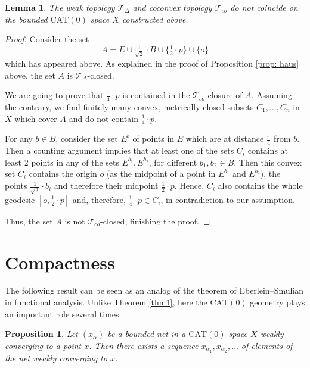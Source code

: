 \documentclass[12pt,leqno]{amsart}
\numberwithin{equation}{section}
\newtheorem{lem}[thm]{Lemma}
\newtheorem{prop}[thm]{Proposition}
\theoremstyle{remark}
\newcommand{\CAT}{\mathrm{CAT}}
\begin{document}
\begin{lem} \label{lem: differ}
	The weak topology $\mathcal T_{\Delta}$ and coconvex topology $\mathcal T_{co}$ do not coincide on the bounded $\CAT(0)$ space $X$ constructed above.
\end{lem}

\begin{proof}
Consider the set 
$$A=E\cup \tfrac 1 {\sqrt 2} \cdot B \cup \{\tfrac 1 2 \cdot p\} \cup \{o\}$$ which has appeared above.
As explained in the proof of Proposition \ref{prop: haus} above, the set $A$ is $\mathcal T_{\Delta}$-closed.

We are going to prove that $\frac 1 4 \cdot p$ is contained in the $\mathcal T_{co}$ closure of $A$. Assuming the contrary, we find finitely many convex, metrically closed subsets $C_1,...,C_n$ in $X$ which cover $A$ and do not contain $\frac 1 4 \cdot p$. 

For any $b\in B$, consider the set $E^b$ of points in $E$ which are at distance $\frac \pi 4$ from $b$. Then a counting argument implies that at least one of the sets $C_i$ contains
at least 2 points in any of the sets $E^{b_1},E^{b_2}$, for different $b_1,b_2\in B$.
 Then this convex set $C_i$ contains the origin $o$ (as the midpoint of a point in $E^{b_1}$ and $E^{b_2}$), the points $\frac 1 {\sqrt 2} \cdot b_{i}$ and therefore their midpoint $\frac 1 2 \cdot p$. Hence, $C_i$ also contains the whole geodesic $[o,\frac 1 2 \cdot p]$ and, therefore, 
 $\frac 1 4 \cdot p \in C_i$, in contradiction to our assumption.

Thus, the set $A$ is not $\mathcal T_{co}$-closed, finishing the proof.
	\end{proof}

\section{Compactness} \label{sec: funct}

The following result can be seen as an analog of the theorem of Eberlein--Smulian in functional analysis. Unlike Theorem \ref{thm1}, here the $\CAT(0)$ geometry plays an important role several times: 

\begin{prop} \label{prop: eber}
	Let $(x_{\alpha})$ be a bounded net in a $\CAT(0)$ space $X$ weakly converging to a point $x$.
Then there exists a sequence $x_{\alpha_1},x_{\alpha_2},\dots$ of elements of the net weakly converging to $x$.
\end{prop}
\end{document}
